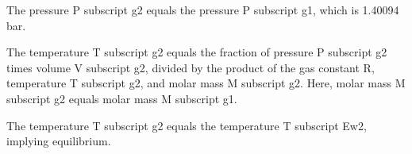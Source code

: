 The pressure P subscript g2 equals the pressure P subscript g1, which is 1.40094 bar.

The temperature T subscript g2 equals the fraction of pressure P subscript g2 times volume V subscript g2, divided by the product of the gas constant R, temperature T subscript g2, and molar mass M subscript g2. Here, molar mass M subscript g2 equals molar mass M subscript g1.

The temperature T subscript g2 equals the temperature T subscript Ew2, implying equilibrium.
